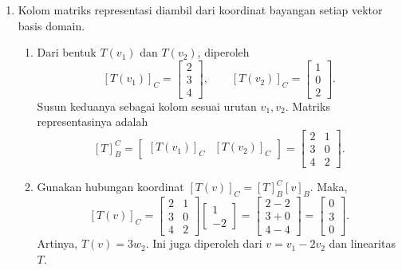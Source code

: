 \documentclass[11pt,a4paper]{article}
\begin{document}
\begin{enumerate}[itemsep=12pt,parsep=5pt]
  \item Kolom matriks representasi diambil dari koordinat bayangan setiap vektor basis domain.
        \begin{enumerate}
          \item Dari bentuk $T(v_1)$ dan $T(v_2)$, diperoleh
                \[
                  [T(v_1)]_C=\begin{bmatrix}2\\3\\4\end{bmatrix},
                  \qquad
                  [T(v_2)]_C=\begin{bmatrix}1\\0\\2\end{bmatrix}.
                \]
                Susun keduanya sebagai kolom sesuai urutan $v_1,v_2$.
                Matriks representasinya adalah
                \[
                  [T]_B^C
                  =\begin{bmatrix}[T(v_1)]_C&[T(v_2)]_C\end{bmatrix}
                  =\begin{bmatrix}2&1\\3&0\\4&2\end{bmatrix}.
                \]

          \item Gunakan hubungan koordinat $[T(v)]_C=[T]_B^C[v]_B$.
                Maka,
                \[
                  [T(v)]_C
                  =\begin{bmatrix}2&1\\3&0\\4&2\end{bmatrix}
                  \begin{bmatrix}1\\-2\end{bmatrix}
                  =\begin{bmatrix}2-2\\3+0\\4-4\end{bmatrix}
                  =\begin{bmatrix}0\\3\\0\end{bmatrix}.
                \]
                Artinya, $T(v)=3w_2$.
                Ini juga diperoleh dari $v=v_1-2v_2$ dan linearitas $T$.
        \end{enumerate}


\end{enumerate}
\end{document}
